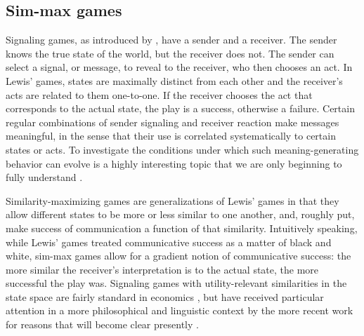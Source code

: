 \subsection{Sim-max games}

Signaling games, as introduced by \citet{Lewis_1969:Convention}, have
a sender and a receiver. The sender knows the true state of the world,
but the receiver does not. The sender can select a signal, or message,
to reveal to the receiver, who then chooses an act. In Lewis' games,
states are maximally distinct from each other and the receiver's acts
are related to them one-to-one. If the receiver chooses the act that
corresponds to the actual state, the play is a success, otherwise a
failure. Certain regular combinations of sender signaling and receiver
reaction make messages meaningful, in the sense that their use is
correlated systematically to certain states or acts. To investigate
the conditions under which such meaning-generating behavior can evolve
is a highly interesting topic that we are only beginning to fully
understand
\citep[e.g.][]{Warneryd1993:Cheap-Talk-Coor,BlumeKim1993:Evolutionary-St,Zollman2005:Talking-to-Neig,Huttegger2007:Evolution-and-t,Pawlowitsch2008:Why-Evolution-d,Barrett2009:The-Evolution-o,Wagner2009:Communication-a,HutteggerSkyrms2010:Evolutionary-Dy,Skyrms2010:Signals,HutteggerZollman2011:Signaling-Games}.

Similarity-maximizing games are generalizations of Lewis' games in
that they allow different states to be more or less similar to one
another, and, roughly put, make success of communication a function of
that similarity. Intuitively speaking, while Lewis' games treated
communicative success as a matter of black and white, sim-max games
allow for a gradient notion of communicative success: the more similar
the receiver's interpretation is to the actual state, the more
successful the play was. Signaling games with utility-relevant
similarities in the state space are fairly standard in economics
\citep[e.g.][]{Spence1973:Job-market-sign,CrawfordSobel1982:Strategic-Infor},
but have received particular attention in a more philosophical and
linguistic context by the more recent work for reasons that will
become clear presently
\citep{Jager2007:The-Evolution-o,JagerRooijvan-Rooij2007:Language-Struct,JagerMetzger2011:Voronoi-Languag}.

